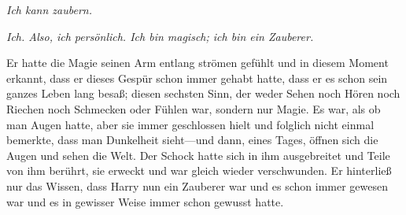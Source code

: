 \emph{Ich kann zaubern.}

\emph{Ich. Also, ich persönlich. Ich bin magisch; ich bin ein Zauberer.}

Er hatte die Magie seinen Arm entlang strömen gefühlt und in diesem Moment erkannt, dass er dieses Gespür schon immer gehabt hatte, dass er es schon sein ganzes Leben lang besaß; diesen sechsten Sinn, der weder Sehen noch Hören noch Riechen noch Schmecken oder Fühlen war, sondern nur Magie. Es war, als ob man Augen hatte, aber sie immer geschlossen hielt und folglich nicht einmal bemerkte, dass man Dunkelheit sieht—und dann, eines Tages, öffnen sich die Augen und sehen die Welt. Der Schock hatte sich in ihm ausgebreitet und Teile von ihm berührt, sie erweckt und war gleich wieder verschwunden. Er hinterließ nur das Wissen, dass Harry nun ein Zauberer war und es schon immer gewesen war und es in gewisser Weise immer schon gewusst hatte.

